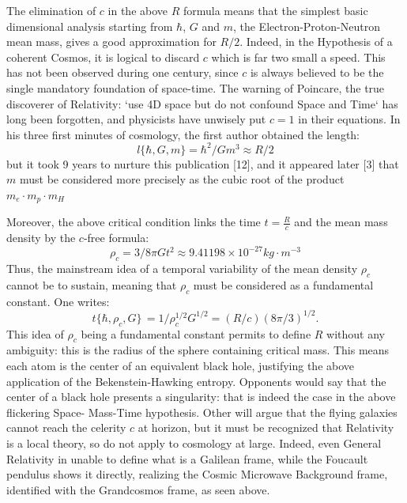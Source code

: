 \documentclass[twoside,draft]{article}
\begin{document}
\begin{sloppypar}
{The elimination of $c$ in the above $R$ formula means that the simplest basic dimensional
analysis starting from $\hbar$, $G$ and $m$, the Electron-Proton-Neutron mean mass, gives a good
approximation for $R/2$. Indeed, in the Hypothesis of a coherent Cosmos, it is logical to discard $c$
which is far two small a speed. This has not been observed during one century, since $c$ is always
believed to be the single mandatory foundation of space-time. The warning of Poincare, the true
discoverer of Relativity: `use 4D space but do not confound Space and Time` has long been
forgotten, and physicists have unwisely put $c = 1$ in their equations.
In his three first minutes of cosmology, the first author obtained the length:
\begin{equation}
l \{\hbar,G,m\} = \hbar^{2} /Gm^{3} \approx R/2
\end{equation}
but it took 9 years to nurture this publication [12], and it appeared later [3] that $m$ must be considered more precisely as the cubic root of the product 
$
m_{e} \cdot m_{p} \cdot m_{H}$

Moreover, the above critical condition
links the time $t = \frac{R}{c}$ and the mean mass density by the $c$-free formula:
\begin{equation}
\rho_{c} = 3/8\pi Gt^{2} \approx 9.41198 \times 10^{-27} kg \cdot m^{-3}
\end{equation}
Thus, the mainstream idea of a temporal variability of the mean density $\rho_{c}$ cannot be to
sustain, meaning that $\rho_{c}$ must be considered as a fundamental constant. One writes:
\begin{equation}
t\{\hbar,\rho_{c} ,G\}\, = 1/\rho_{c}^{1/2} G^{1/2} = (R/c) (8\pi/3)^{1/2}.
\end{equation}
This idea of $\rho_{c}$ being a fundamental constant permits to define $R$ without any ambiguity: this is the 
radius of the sphere containing critical mass. This means each atom is the center of an equivalent black hole,
justifying the above application of the Bekenstein-Hawking entropy. Opponents would say that the
center of a black hole presents a singularity: that is indeed the case in the above flickering Space-
Mass-Time hypothesis. Other will argue that the flying galaxies cannot reach the celerity $c$ at
horizon, but it must be recognized that Relativity is a local theory, so do not apply to cosmology at large.
Indeed, even General Relativity in unable to define what is a Galilean frame, while the Foucault
pendulus shows it directly, realizing the Cosmic Microwave Background frame, identified with the
Grandcosmos frame, as seen above.

}
\end{sloppypar}
\end{document}
